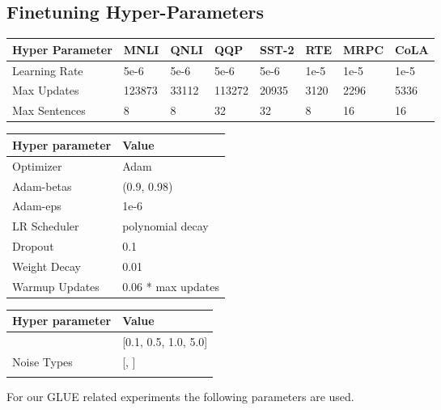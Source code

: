 \documentclass[11pt,a4paper]{article}
\begin{document}
\subsection{Finetuning Hyper-Parameters}
\begin{table*}[!htpb]
\centering
\begin{tabular}{@{}llllllll@{}}
\toprule
Hyper Parameter & MNLI   & QNLI  & QQP    & SST-2 & RTE  & MRPC & CoLA \\ \midrule
Learning Rate   & 5e-6   & 5e-6  & 5e-6   & 5e-6  & 1e-5 & 1e-5 & 1e-5 \\
Max Updates     & 123873 & 33112 & 113272 & 20935 & 3120 & 2296 & 5336 \\
Max Sentences   & 8      & 8     & 32     & 32    & 8    & 16   & 16   \\
\bottomrule  
\end{tabular}
\caption{Task specific hyper parameters for GLUE experiments}
\end{table*}

\begin{table*}[!htpb]
\centering
\begin{tabular}{@{}ll@{}}
\toprule
Hyper parameter & Value              \\ \midrule
Optimizer       & Adam               \\
Adam-betas      & (0.9, 0.98)        \\
Adam-eps        & 1e-6               \\
LR Scheduler    & polynomial decay   \\
Dropout         & 0.1                \\
Weight Decay    & 0.01               \\
Warmup Updates  & 0.06 * max updates \\
\bottomrule
\end{tabular}
\quad
\begin{tabular}{@{}ll@{}}
\toprule
Hyper parameter & Value           \\ \midrule
          & [0.1, 0.5, 1.0, 5.0] \\
Noise Types     & [, ] \\
        & \\ 
\bottomrule
\end{tabular}
\caption{Hyper parameters for R3F experiments on GLUE}
\end{table*}
For our GLUE related experiments the following parameters are used.
\end{document}
